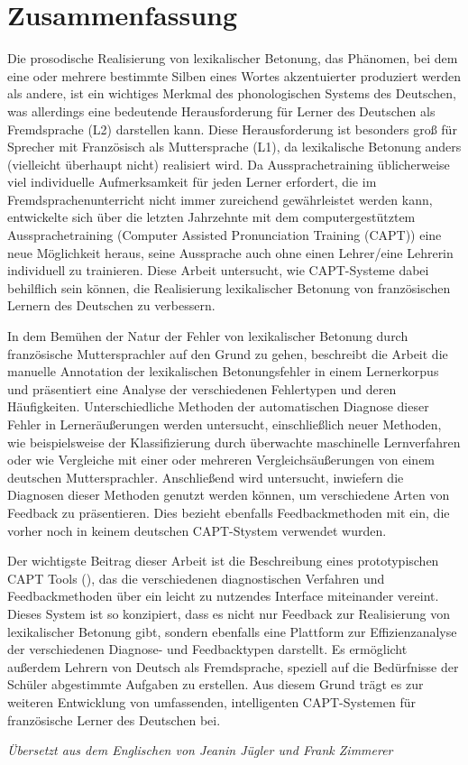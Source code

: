 %
\chapter*{Zusammenfassung}
\label{sec:abstract:de}
\vspace*{-10mm}

Die prosodische Realisierung von lexikalischer Betonung, das Phänomen, bei dem eine oder mehrere bestimmte Silben eines Wortes akzentuierter produziert werden als andere, ist ein wichtiges Merkmal des phonologischen Systems des Deutschen, was allerdings eine bedeutende Herausforderung für Lerner des Deutschen als Fremdsprache (L2) darstellen kann. Diese Herausforderung ist besonders groß für Sprecher mit Französisch als Muttersprache (L1), da lexikalische Betonung anders (vielleicht überhaupt nicht) realisiert wird. Da Aussprachetraining üblicherweise viel individuelle Aufmerksamkeit für jeden Lerner erfordert, die im Fremdsprachenunterricht nicht immer zureichend gewährleistet werden kann, entwickelte sich über die letzten Jahrzehnte mit dem computergestütztem Aussprachetraining (Computer Assisted Pronunciation Training (CAPT)) eine neue Möglichkeit heraus, seine Aussprache auch ohne einen Lehrer/eine Lehrerin individuell zu trainieren. Diese Arbeit untersucht, wie CAPT-Systeme dabei behilflich sein können, die Realisierung lexikalischer Betonung von französischen Lernern des Deutschen zu verbessern. 

In dem Bemühen der Natur der Fehler von lexikalischer Betonung durch französische Muttersprachler auf den Grund zu gehen, beschreibt die Arbeit die manuelle Annotation der lexikalischen Betonungsfehler in einem Lernerkorpus und präsentiert eine Analyse der verschiedenen Fehlertypen und deren Häufigkeiten. Unterschiedliche Methoden der automatischen Diagnose dieser Fehler in Lerneräußerungen werden untersucht, einschließlich neuer Methoden, wie beispielsweise der Klassifizierung durch überwachte maschinelle Lernverfahren oder wie Vergleiche mit einer oder mehreren Vergleichsäußerungen von einem deutschen Muttersprachler. Anschließend wird untersucht, inwiefern die Diagnosen dieser Methoden genutzt werden können, um verschiedene Arten von Feedback zu präsentieren. Dies bezieht ebenfalls Feedbackmethoden mit ein, die vorher noch in keinem deutschen CAPT-Stystem verwendet wurden. 

Der wichtigste Beitrag dieser Arbeit ist die Beschreibung eines prototypischen CAPT Tools (), das die verschiedenen diagnostischen Verfahren und Feedbackmethoden über ein leicht zu nutzendes Interface miteinander vereint. Dieses System ist so konzipiert, dass es nicht nur Feedback zur Realisierung von lexikalischer Betonung gibt, sondern ebenfalls eine Plattform zur Effizienzanalyse der verschiedenen Diagnose- und Feedbacktypen darstellt. Es ermöglicht außerdem Lehrern von Deutsch als Fremdsprache, speziell auf die Bedürfnisse der Schüler abgestimmte Aufgaben zu erstellen. Aus diesem Grund trägt es zur weiteren Entwicklung von umfassenden, intelligenten CAPT-Systemen für französische Lerner des Deutschen bei. 


\begin{flushright}
\textit{Übersetzt aus dem Englischen von Jeanin Jügler und Frank Zimmerer}
\end{flushright}